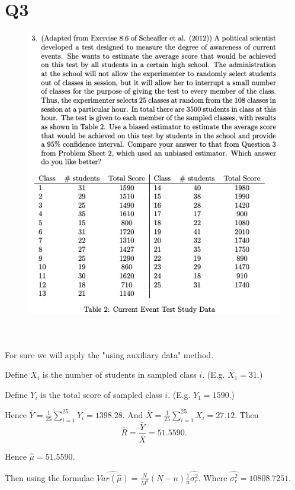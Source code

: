 \documentclass[12pt]{article}%
\begin{document}
\section{Q3}
\begin{figure}[htp]
    \includegraphics[width = 14cm]{img/Q3.png}
\end{figure}

~\ 

For sure we will apply the "using auxiliary data" method.

Define $X_i$ is the number of students in sampled class $i$. (E.g. 
$X_1=31$.)

Define $Y_i$ is the total score of sampled class $i$. (E.g. $Y_1=1590.$)

Hence $\bar{Y}=\frac{1}{25}\sum_{i=1}^{25}Y_i=1398.28.$ And 
$\bar{X}=\frac{1}{25}\sum_{i=1}^{25}X_i=27.12.$ 
Then $$\hat{R}=\frac{\bar{Y}}{\bar{X}}=51.5590.$$

Hence $\hat{\mu}=51.5590.$

Then using the formulae 
$\widehat{Var(\hat{\mu})}=\frac{N}{M^2}(N-n)\frac{1}{n}\hat{\sigma_r^{2}}.$ 
Where $\hat{\sigma_r^{2}}=10808.7251.$
\end{document}
